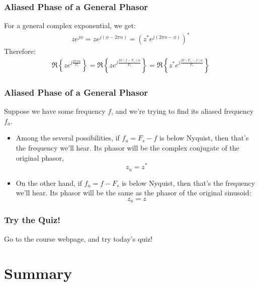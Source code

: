 \documentclass{beamer}
\begin{document}
\begin{frame}
  \frametitle{Aliased Phase of a General Phasor}

  For a general complex exponential, we get:
  \begin{align*}
    ze^{j\phi} = ze^{j(\phi-2\pi n)} = \left(z^* e^{j(2\pi n-\phi)}\right)^*
  \end{align*}
  Therefore:
  \begin{align*}
    \Re\left\{z e^{j\frac{2\pi fn}{F_s}} \right\} =
    \Re\left\{z e^{j\frac{2\pi (f-F_s)n}{F_s}} \right\} =
    \Re\left\{z^* e^{j\frac{2\pi (F_s-f)n}{F_s}} \right\}
  \end{align*}
\end{frame}


\begin{frame}
  \frametitle{Aliased Phase of a General Phasor}

  Suppose we have some frequency $f$, and we're trying to find its
  aliased frequency $f_a$.
  \begin{itemize}
  \item Among the several possibilities, if $f_a=F_s-f$ is below
    Nyquist, then that's the frequency we'll hear.  Its phasor will be
    the complex conjugate of the original phasor,
    \[
    z_a = z^*
    \]
  \item On the other hand, if $f_a=f-F_s$ is below Nyquist, then
    that's the frequency we'll hear.  Its phasor will be the same as
    the phasor of the original sinusoid:
    \[
    z_a = z
    \]    
  \end{itemize}
  
\end{frame}

\begin{frame}
  \frametitle{Try the Quiz!}
  Go to the course webpage, and try today's quiz!
\end{frame}

\section[Summary]{Summary}
\setcounter{subsection}{1}
\end{document}
